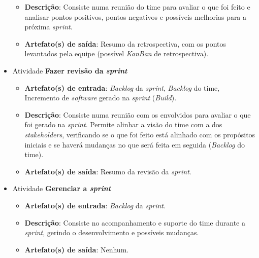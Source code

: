 \begin{itemize}
\begin{itemize}
	    \item \textbf{Descrição}: Consiste numa reunião do time para avaliar o que foi feito e analisar pontos
	      positivos, pontos negativos e possíveis melhorias para a próxima \textit{sprint}.
	    
	    \item \textbf{Artefato(s) de saída}: Resumo da retrospectiva, com os pontos levantados pela equipe
	     (possível \textit{KanBan} de retrospectiva).
		  
	  \end{itemize}
	  
     \item Atividade \textbf{Fazer revisão da \textit{sprint}}
      
	  \begin{itemize}
	    \item \textbf{Artefato(s) de entrada}: \textit{Backlog} da \textit{sprint}, \textit{Backlog} do time,
	      Incremento de \textit{software} gerado na \textit{sprint} (\textit{Build}).
	    
	    \item \textbf{Descrição}: Consiste numa reunião com os envolvidos para avaliar o que foi gerado na \textit{sprint}.
	      Permite alinhar a visão do time com a dos \textit{stakeholders}, verificando se o que foi feito está
	      alinhado com os propósitos iniciais e se haverá mudanças no que será feita em seguida (\textit{Backlog} do time).
	      	    
	    \item \textbf{Artefato(s) de saída}: Resumo da revisão da \textit{sprint}.
		  
	  \end{itemize}
	  
      \item Atividade \textbf{Gerenciar a \textit{sprint}}
      
	  \begin{itemize}
	    \item \textbf{Artefato(s) de entrada}: \textit{Backlog} da \textit{sprint}.
	    
	    \item \textbf{Descrição}: Consiste no acompanhamento e suporte do time durante a \textit{sprint},
	      gerindo o desenvolvimento e possíveis mudanças.
	    
	    \item \textbf{Artefato(s) de saída}: Nenhum.
		  
	  \end{itemize}
	

\end{itemize}
